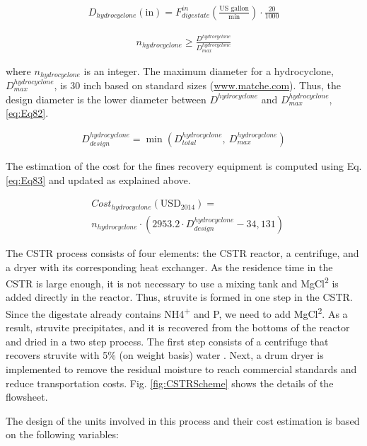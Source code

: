 \begin{refsection}[referencesCh2]
\begin{align}
	{D}_{hydrocyclone}\left( {\text{in}} \right) = F_{digestate}^{in} \left( \frac{\text{US gallon}}{\text{min}} \right) \cdot \frac{20}{1000} \label{eq:Eq80}
\end{align}

\begin{align}
	{n}_{hydrocyclone} \ge \frac{D^{hydrocyclone}}{D_{max}^{hydrocyclone}} \label{eq:Eq81}
\end{align}

where ${n}_{hydrocyclone}$ is an integer. The maximum diameter for a hydrocyclone, $D_{max}^{hydrocyclone}$,  is 30 inch based on standard sizes (\url{www.matche.com}).  Thus, the design diameter is the lower diameter between $D^{hydrocyclone}$ and $D_{max}^{hydrocyclone}$, \ref{eq:Eq82}.

\begin{align}
	D_{design}^{hydrocyclone} = \min (D_{total}^{hydrocyclone}, \ D_{max}^{hydrocyclone}) \label{eq:Eq82}
\end{align}

The estimation of the cost for the fines recovery equipment is computed using Eq. \ref{eq:Eq83} and updated as explained above.

\begin{align}
	& Cost_{hydrocyclone} \left( \text{USD}_{2014} \right) = \label{eq:Eq83} \\
	& {n}_{hydrocyclone} \cdot \left( {2953.2} \cdot D_{design}^{hydrocyclone} - 34,131 \right) \nonumber
\end{align}

The CSTR process consists of four elements: the CSTR reactor, a centrifuge, and a dryer with its corresponding heat exchanger. As the residence time in the CSTR is large enough, it is not necessary to use a mixing tank and MgCl\textsuperscript{2} is added directly in the reactor. Thus, struvite is formed in one step in the CSTR. Since the digestate already contains NH4\textsuperscript{+} and P, we need to add MgCl\textsuperscript{2}. As a result, struvite precipitates, and it is recovered from the bottoms of the reactor and dried in a two step process. The first step consists of a centrifuge that recovers struvite with 5\% (on weight basis) water \citep{baasal1989preliminary}. Next, a drum dryer is implemented to remove the residual moisture to reach commercial standards and reduce transportation costs. Fig. \ref{fig:CSTRScheme} shows the details of the flowsheet. 

The design of the units involved in this process and their cost estimation is based on the following variables:


\end{refsection}
